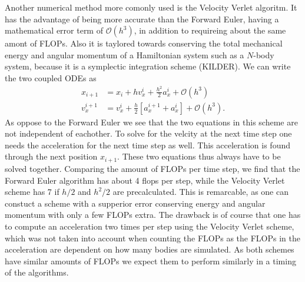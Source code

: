 \documentclass[twocolumn]{aastex62}
\begin{document}
Another numerical method more comonly used is the Velocity Verlet algoritm. It
has the advantage of being more accurate than the Forward Euler, having a
mathematical error term of $\mathcal{O}(h^3)$, in addition to requireing about
the same amont of FLOPs. Also it is taylored towards conserving the total
mechanical energy and angular momentum of a Hamiltonian system such as a
$N$-body system, because it is a symplectic integration scheme (KILDER). We can write the
two coupled ODEs as 
\begin{align}
    x_{i+1} &= x_i + hv_x^i + \frac{h^2}{2}a_x^i + \mathcal{O}(h^3)\\
    v_x^{i+1} &= v_x^i + \frac{h}{2}[a_x^{i+1} + a_x^i] + \mathcal{O}(h^3).
\end{align}
As oppose to the Forward Euler we see that the two equations in this scheme are
not independent of eachother. To solve for the velcity at the next time step one
needs the acceleration for the next time step as well. This acceleration is
found through the next position $x_{i+1}$. These two equations thus always have
to be solved together. Comparing the amount of FLOPs per time step, we find that
the Forward Euler algorithm has about 4 flops per step, while the Velocity
Verlet scheme has 7 if $h/2$ and $h^2/2$ are precalculated. This is remarcable,
as one can constuct a scheme with a supperior error conserving energy and
angular momentum with only a few FLOPs extra. The drawback is of course that one
has to compute an acceleration two times per step using the Velocity Verlet
scheme, which was not taken into account when counting the FLOPs as the FLOPs in
the acceleration are dependent on how many bodies are simulated.
As both schemes have similar amounts of FLOPs we expect them to perform
similarly in a timing of the algorithms.
\end{document}
